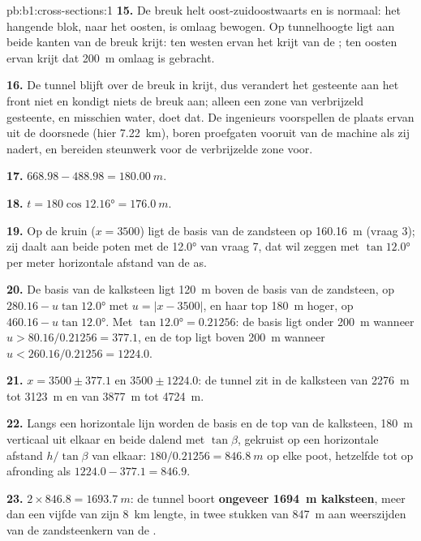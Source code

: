 \begin{solution}{pb:b1:cross-sections:1}
\textbf{15.} De breuk helt oost-zuidoostwaarts en is normaal: het hangende blok, naar het oosten, is omlaag bewogen.
Op tunnelhoogte ligt aan beide kanten van de breuk krijt: ten westen ervan het krijt van de ; ten oosten
ervan krijt dat \qty{200}{m} omlaag is gebracht.

\textbf{16.} De tunnel blijft over de breuk in krijt, dus verandert het gesteente aan het front niet en kondigt niets
de breuk aan; alleen een zone van verbrijzeld gesteente, en misschien water, doet dat. De ingenieurs voorspellen de
plaats ervan uit de doorsnede (hier \qty{7.22}{km}), boren proefgaten vooruit van de machine als zij nadert, en bereiden
steunwerk voor de verbrijzelde zone voor.

\textbf{17.} $668.98 - 488.98 = \qty{180.00}{m}$.

\textbf{18.} $t = 180\cos\ang{12.16} = \qty{176.0}{m}$.

\textbf{19.} Op de kruin ($x = 3500$) ligt de basis van de zandsteen op \qty{160.16}{m} (vraag 3); zij daalt aan
beide poten met de  \ang{12.0} van vraag 7, dat wil zeggen met $\tan\ang{12.0}$ per meter horizontale
afstand van de as.

\textbf{20.} De basis van de kalksteen ligt \qty{120}{m} boven de basis van de zandsteen, op $280.16 - u\tan\ang{12.0}$ met
$u = |x - 3500|$, en haar top \qty{180}{m} hoger, op $460.16 - u\tan\ang{12.0}$. Met $\tan\ang{12.0} =
0.21256$: de basis ligt onder \qty{200}{m} wanneer $u > 80.16/0.21256 = 377.1$, en de top ligt boven
\qty{200}{m} wanneer $u < 260.16/0.21256 = 1224.0$.

\textbf{21.} $x = 3500 \pm 377.1$ en $3500 \pm 1224.0$: de tunnel zit in de kalksteen van
\qty{2276}{m} tot \qty{3123}{m} en van \qty{3877}{m} tot \qty{4724}{m}.

\textbf{22.} Langs een horizontale lijn worden de basis en de top van de kalksteen, \qty{180}{m} verticaal uit elkaar en
beide dalend met $\tan\beta$, gekruist op een horizontale afstand $h/\tan\beta$ van elkaar: $180/0.21256 = \qty{846.8}{m}$
op elke poot, hetzelfde tot op afronding als $1224.0 - 377.1 = 846.9$.

\textbf{23.} $2\times846.8 = \qty{1693.7}{m}$: de tunnel boort \textbf{ongeveer
\qty[text-series-to-math=true]{1694}{m} kalksteen}, meer dan een vijfde van zijn
\qty{8}{km} lengte, in twee stukken van \qty{847}{m} aan weerszijden van de zandsteenkern van de .
\end{solution}

